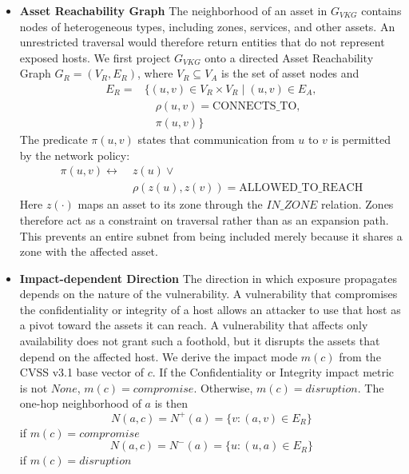 \documentclass[conference]{IEEEtran}
\begin{document}
    \begin{itemize}
        \item \textbf{Asset Reachability Graph} The neighborhood of an asset in $G_{VKG}$ contains nodes of heterogeneous types, including zones, services, and other assets. An unrestricted traversal would therefore return entities that do not represent exposed hosts. We first project $G_{VKG}$ onto a directed Asset Reachability Graph $G_R = (V_R, E_R)$, where $V_R \subseteq V_A$ is the set of asset nodes and
        \begin{equation}
        \begin{aligned}
        E_R ={}& \{(u,v) \in V_R \times V_R \mid
                  (u,v) \in E_A, \\
               &\quad \rho(u,v) = \mathrm{CONNECTS\_TO}, \\
               &\quad \pi(u,v)\}
        \end{aligned}
        \end{equation}
        The predicate $\pi(u,v)$ states that communication from $u$ to $v$ is permitted by the network policy:
        \begin{equation}
        \begin{aligned}
        \pi(u,v) \longleftrightarrow\;& z(u) \lor \\
        &\rho(z(u), z(v)) = \mathrm{ALLOWED\_TO\_REACH}
        \end{aligned}
        \end{equation}
        Here $z(\cdot)$ maps an asset to its zone through the $IN\_ZONE$ relation. Zones therefore act as a constraint on traversal rather than as an expansion path. This prevents an entire subnet from being included merely because it shares a zone with the affected asset.
        
        \item \textbf{Impact-dependent Direction} The direction in which exposure propagates depends on the nature of the vulnerability. A vulnerability that compromises the confidentiality or integrity of a host allows an attacker to use that host as a pivot toward the assets it can reach. A vulnerability that affects only availability does not grant such a foothold, but it disrupts the assets that depend on the affected host. We derive the impact mode $m(c)$ from the CVSS v3.1 base vector of $c$. If the Confidentiality or Integrity impact metric is not $None$, $m(c) = compromise$. Otherwise, $m(c) = disruption$. The one-hop neighborhood of $a$ is then
        \begin{equation}
            N(a,c) = N^+(a) = \{v:(a,v) \in E_R\} 
        \end{equation}
        if $m(c) = compromise$
        \begin{equation}
            N(a,c) = N^-(a) = \{u:(u,a) \in E_R \}
        \end{equation}
        if $m(c) = disruption$
        

\end{itemize}
\end{document}
